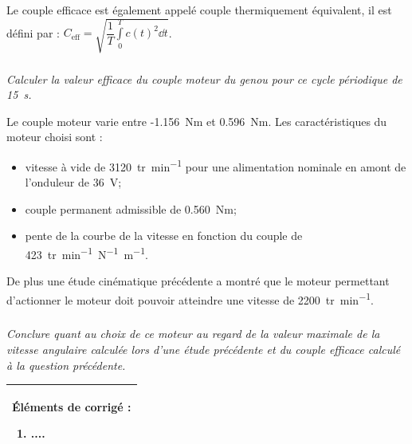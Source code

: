 \documentclass[10pt,fleqn]{article} %
\begin{document}
\begin{multicols}{2}
\ifprof
\begin{corrige}
\end{corrige}
\else
\fi

Le couple efficace est également appelé couple thermiquement équivalent, il est défini par :
$C_{\text{eff}}=\sqrt{\dfrac{1}{T}\int\limits_0^Tc(t)^2 \dd t}$.



\subparagraph{} \textit{Calculer la valeur efficace du couple moteur du genou pour ce cycle périodique de \SI{15}{s}.}

Le couple moteur varie entre -\SI{1,156}{Nm} et \SI{0,596}{Nm}.
Les caractéristiques du moteur choisi sont :
\begin{itemize}
\item vitesse à vide de \SI{3120}{tr.min^{-1}} pour une alimentation nominale en amont de l’onduleur de \SI{36}{V};
\item couple permanent admissible de \SI{0,560}{Nm};
\item pente de la courbe de la vitesse en fonction du couple de \SI{423}{tr.min^{-1}N^{-1}m^{-1}}.
\end{itemize}

De plus une étude cinématique précédente a montré que le moteur permettant d'actionner le moteur doit pouvoir atteindre une vitesse de \SI{2200}{tr.min^{-1}}.
\ifprof
\begin{corrige}
\end{corrige}
\else
\fi

\subparagraph{} \textit{Conclure quant au choix de ce moteur au regard de la valeur maximale de la vitesse angulaire calculée lors d'une étude précédente et du couple efficace calculé à la question précédente.}

\ifprof
\begin{corrige}
\end{corrige}
\else
\fi

\ifprof
\else

\noindent 
\footnotesize
\begin{tabular}{|p{.95\linewidth}|}
\hline
Éléments de corrigé :
\begin{enumerate}
\item ....
\end{enumerate} \\
\hline
\end{tabular}
\normalsize
\fi

\ifprof
\else
\end{multicols}
\fi
\end{document}
